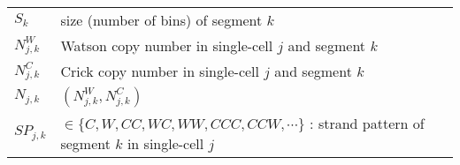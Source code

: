 \documentclass[12pt]{article}
\renewcommand{\j}{j} %
\renewcommand{\k}{k} %
\newcommand{\N}{N} %
\begin{document}
\begin{table*}[tb]
\begin{tabular}{  p{4cm} p{12.5cm} }
		$S_\k$ & size (number of bins) of segment $\k$\\
		
		$\N_{\j, \k}^W$ & Watson copy number in single-cell $\j$ and segment $\k$\\
		
		$\N_{\j, \k}^C$ & Crick copy number in single-cell $\j$ and segment $\k$\\
		
		$\N_{\j, \k}$ & $(\N_{\j, \k}^W, \N_{\j, \k}^C)$\\
		
		$SP_{\j,\k}$ & $\in \{C,W,CC,WC,WW,CCC,CCW, \cdots\}$ : strand pattern of segment $\k$ in single-cell $\j$\\
		\hline
	\end{tabular}
	\label{notations}\vspace{-4.5mm}
\end{table*}

%
% 
% 
% 
% 




\end{document}
